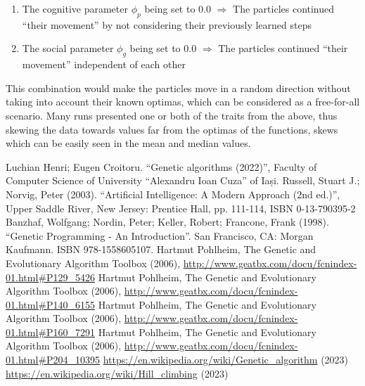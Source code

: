 \documentclass[conference]{IEEEtran}
\begin{document}
\begin{enumerate}
    \item The cognitive parameter $\phi_p$ being set to $0.0$ $\Rightarrow$ The particles continued ``their movement'' by not considering
    their previously learned steps
    \item The social parameter $\phi_g$ being set to $0.0$ $\Rightarrow$ The particles continued ``their movement'' independent of
    each other
\end{enumerate}

This combination would make the particles move in a random direction without taking into account their known optimas, which
can be considered as a free-for-all scenario. Many runs presented one or both of the traits from the above, thus skewing the
data towards values far from the optimas of the functions, skews which can be easily seen in the mean and median values.

\begin{thebibliography}{00}
     Luchian Henri; Eugen Croitoru. ``Genetic algorithms (2022)'', Faculty of Computer Science of University ``Alexandru Ioan Cuza'' of Iași.
     Russell, Stuart J.; Norvig, Peter (2003). ``Artificial Intelligence: A Modern Approach (2nd ed.)'', Upper Saddle River, New Jersey: Prentice Hall, pp. 111-114, ISBN 0-13-790395-2 
     Banzhaf, Wolfgang; Nordin, Peter; Keller, Robert; Francone, Frank (1998). ``Genetic Programming - An Introduction''. San Francisco, CA: Morgan Kaufmann. ISBN 978-1558605107.
     Hartmut Pohlheim, The Genetic and Evolutionary Algorithm Toolbox (2006), \url{http://www.geatbx.com/docu/fcnindex-01.html#P129_5426}
     Hartmut Pohlheim, The Genetic and Evolutionary Algorithm Toolbox (2006), \url{http://www.geatbx.com/docu/fcnindex-01.html#P140_6155}
     Hartmut Pohlheim, The Genetic and Evolutionary Algorithm Toolbox (2006), \url{http://www.geatbx.com/docu/fcnindex-01.html#P160_7291}
     Hartmut Pohlheim, The Genetic and Evolutionary Algorithm Toolbox (2006), \url{http://www.geatbx.com/docu/fcnindex-01.html#P204_10395}
     \url{https://en.wikipedia.org/wiki/Genetic_algorithm} (2023)
     \url{https://en.wikipedia.org/wiki/Hill_climbing} (2023)
\end{thebibliography}
    
\end{document}
